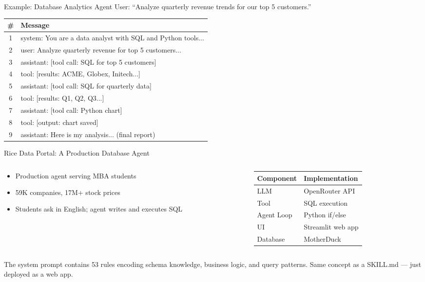 \documentclass[aspectratio=169]{beamer}
\begin{document}
\begin{frame}{Example: Database Analytics Agent}
User: ``Analyze quarterly revenue trends for our top 5 customers.''
\vspace{0.3cm}
\begin{shadedbox}[title=\textbf{What the LLM Sees at Report Time}]
\begin{center}
\small
\begin{tabular}{cl}
\# & \textbf{Message} \\
\midrule
1 & system: You are a data analyst with SQL and Python tools... \\
2 & user: Analyze quarterly revenue for top 5 customers... \\
3 & assistant: [tool call: SQL for top 5 customers] \\
4 & tool: [results: ACME, Globex, Initech...] \\
5 & assistant: [tool call: SQL for quarterly data] \\
6 & tool: [results: Q1, Q2, Q3...] \\
7 & assistant: [tool call: Python chart] \\
8 & tool: [output: chart saved] \\
9 & assistant: Here is my analysis... (final report)
\end{tabular}
\end{center}
\end{shadedbox}
\end{frame}

\begin{frame}{Rice Data Portal: A Production Database Agent}
\begin{columns}[T]
\begin{column}{0.5\textwidth}
\begin{itemize}\small
  \item Production agent serving MBA students
  \item 59K companies, 17M+ stock prices
  \item Students ask in English; agent writes and executes SQL
\end{itemize}
\end{column}
\begin{column}{0.5\textwidth}
\begin{shadedbox}[title=\textbf{Architecture}]
\begin{tabular}{ll}
\textbf{Component} & \textbf{Implementation} \\
\midrule
LLM & OpenRouter API \\
Tool & SQL execution \\
Agent Loop & Python if/else \\
UI & Streamlit web app \\
Database & MotherDuck \\
\end{tabular}
\end{shadedbox}
\end{column}
\end{columns}
\vspace{0.3cm}
The system prompt contains 53 rules encoding schema knowledge, business logic, and query patterns. \alert{Same concept as a SKILL.md --- just deployed as a web app.}
\end{frame}
\end{document}
